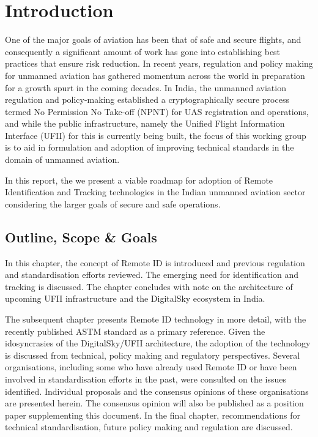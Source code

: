 \documentclass{ua_wgs_base}
\begin{document}

\settowidth{\nomlabelwidth}{UTM-SP}
\printnomenclature{}\cleardoublepage{}

\chapter{Introduction}

One of the major goals of aviation has been that of safe and secure
flights, and consequently a significant amount of work has gone into
establishing best practices that ensure risk reduction. In recent
years, regulation and policy making for unmanned aviation has gathered
momentum across the world in preparation for a growth spurt in the
coming decades. In India, the unmanned aviation regulation and policy-making
established a cryptographically secure process termed No Permission
No Take-off (NPNT) for UAS registration and operations, and while
the public infrastructure, namely the Unified Flight Information Interface
(UFII)
for this is currently being built, the focus of this working group
is to aid in formulation and adoption of improving technical standards
in the domain of unmanned aviation.

In this report, the we present a viable roadmap for adoption of Remote
Identification and Tracking technologies in the Indian unmanned aviation
sector considering the larger goals of secure and safe operations.

\section{Outline, Scope \& Goals }

In this chapter, the concept of Remote ID is introduced and previous
regulation and standardisation efforts reviewed. The emerging need
for identification and tracking is discussed. The chapter concludes
with note on the architecture of upcoming UFII infrastructure and
the DigitalSky ecosystem in India. 

The subsequent chapter presents Remote ID technology in more detail,
with the recently published ASTM standard \cite{ASTM:F3411:19} as
a primary reference. Given the idosyncrasies of the DigitalSky/UFII
architecture\cite{RPASGM2020}, the adoption of the technology is
discussed from technical, policy making and regulatory perspectives.
Several organisations, including some who have already used Remote
ID or have been involved in standardisation efforts in the past, were
consulted on the issues identified. Individual proposals and the consensus
opinions of these organisations are presented herein. The consensus
opinion will also be published as a position paper supplementing this
document. In the final chapter, recommendations for technical standardisation,
future policy making and regulation are discussed.
\end{document}
